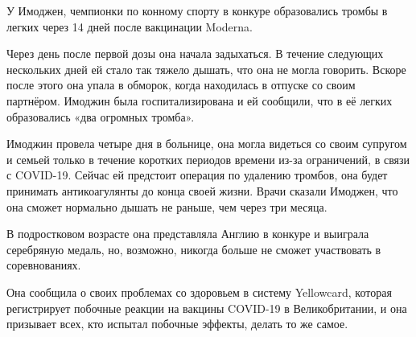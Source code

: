 У Имоджен, чемпионки по конному спорту в конкуре образовались тромбы в легких
через 14 дней после вакцинации Moderna.

Через день после первой дозы она начала задыхаться. В течение следующих
нескольких дней ей стало так тяжело дышать, что она не могла говорить. Вскоре
после этого она упала в обморок, когда находилась в отпуске со своим
партнёром. Имоджин была госпитализирована и ей сообщили, что в её легких
образовались «два огромных тромба».

Имоджин провела четыре дня в больнице, она могла видеться со своим супругом и
семьей только в течение коротких периодов времени из-за ограничений, в связи с
COVID-19. Сейчас ей предстоит операция по удалению тромбов, она будет принимать
антикоагулянты до конца своей жизни. Врачи сказали Имоджен, что она сможет
нормально дышать не раньше, чем через три месяца.

В подростковом возрасте она представляла Англию в конкуре и выиграла серебряную
медаль, но, возможно, никогда больше не сможет участвовать в соревнованиях.

Она сообщила о своих проблемах со здоровьем в систему Yellowcard, которая
регистрирует побочные реакции на вакцины COVID-19 в Великобритании, и она
призывает всех, кто испытал побочные эффекты, делать то же самое.

